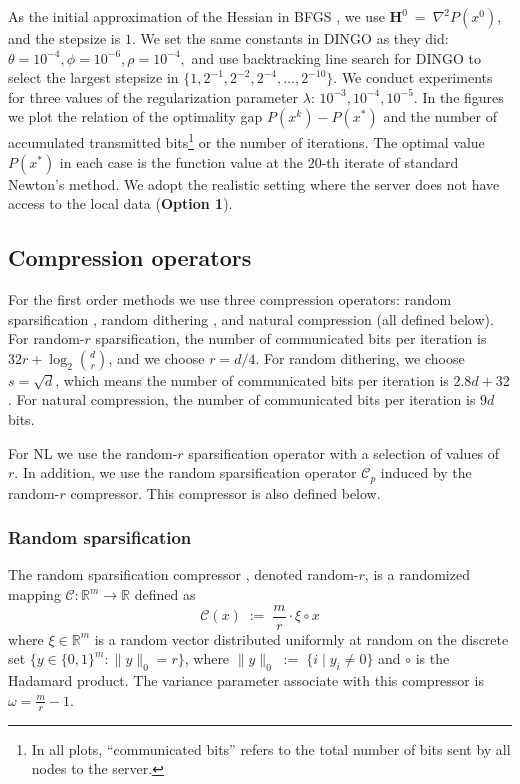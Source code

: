 \documentclass[12pt]{article}
\newcommand{\eqdef}{\; { := }\;}
\newcommand{\R}{\mathbb{R}}
\newcommand{\mH}{\mathbf{H}}
\newcommand{\cC}{{\mathcal{C}}}
\begin{document}
As the initial approximation of the Hessian in BFGS \citep{Broyden1967, Fletcher1970, Goldfarb1970, shanno1970conditioning}, we use $\mH^0~=~\nabla^2P(x^0)$, and the stepsize is $1$. We set the same constants in DINGO \citep{DINGO2019} as they did: $\theta=10^{-4}, \phi=10^{-6}, \rho=10^{-4},$ and use backtracking line search for DINGO to select the largest stepsize in $\{1, 2^{-1}, 2^{-2}, 2^{-4},\dots, 2^{-10}\}$. We conduct experiments for three values of the regularization parameter $\lambda$: $10^{-3}, 10^{-4}, 10^{-5}$.  
In the figures we plot the relation of the optimality gap $P(x^k) - P(x^*)$ and the number of accumulated transmitted bits\footnote{In all plots, ``communicated bits'' refers to the total number of bits sent by all nodes to the server.} or the number of iterations. The optimal value $P(x^*)$ in each case is the function value at the $20$-th iterate of standard Newton's method.  We adopt the realistic setting where the server does not have access to the local data ({\bf Option 1}).



\subsection{Compression operators} For the first order methods we use three compression operators: random sparsification \citep{stich2018sparsified}, random dithering \citep{Alistarh17}, and natural compression \citep{Cnat} (all defined below).
For random-$r$ sparsification, the number of communicated  bits per iteration is $32r+\log_2{\binom{d}{r}}$, and we choose $r = d/4$. For random dithering, we choose $s = \sqrt{d}$, which means the
number of communicated bits per iteration is $2.8d + 32$. For natural compression, the number of communicated bits per iteration is $9d$ bits. 

For {\sf NL} we use the random-$r$ sparsification operator with a selection of values of~$r$.  In addition, we use the random sparsification operator $\cC_p$ induced by the random-$r$ compressor. This compressor is also defined below.




\subsubsection{Random sparsification} The random sparsification compressor \citep{stich2018sparsified}, denoted random-$r$, is a randomized mapping $\cC:\R^m\to \R$ defined as $$\cC(x) \eqdef \frac{m}{r} \cdot \xi \circ x$$ where  $\xi \in \R^m$ is a random vector distributed uniformly at random on the discrete set $\{  y \in \{0, 1 \}^m : \|y\|_0 = r  \}$, where $\|y\|_0\eqdef \{i \;|\; y_i \neq 0\}$ and  $\circ$ is the Hadamard product. The variance  parameter associate with this compressor is $\omega = \frac{m}{r} - 1$. 
\end{document}
